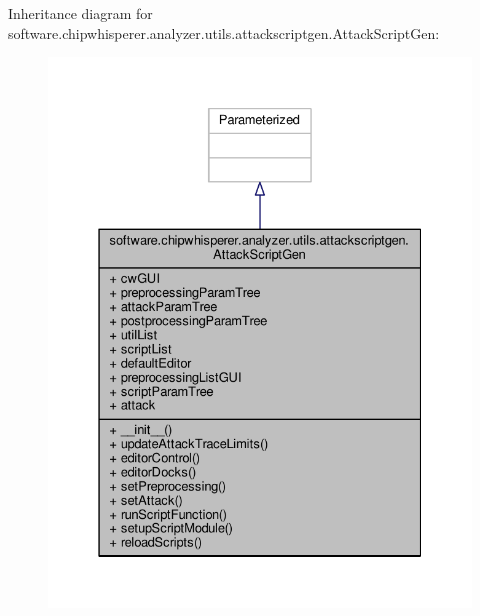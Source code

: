 Inheritance diagram for software.\+chipwhisperer.\+analyzer.\+utils.\+attackscriptgen.\+Attack\+Script\+Gen\+:\nopagebreak
\begin{figure}[H]
\begin{center}
\leavevmode
\includegraphics[width=331pt]{d8/d75/classsoftware_1_1chipwhisperer_1_1analyzer_1_1utils_1_1attackscriptgen_1_1AttackScriptGen__inherit__graph}
\end{center}
\end{figure}


